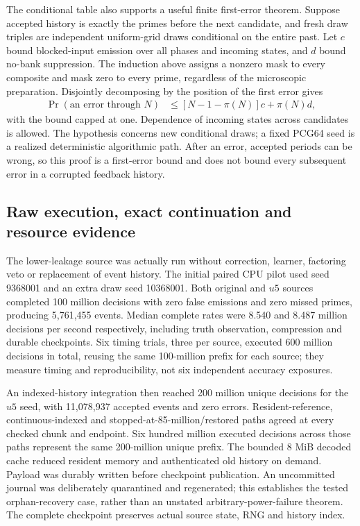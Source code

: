 The conditional table also supports a useful finite first-error theorem. Suppose accepted history is exactly the primes before the next candidate, and fresh draw triples are independent uniform-grid draws conditional on the entire past. Let $c$ bound blocked-input emission over all phases and incoming states, and $d$ bound no-bank suppression. The induction above assigns a nonzero mask to every composite and mask zero to every prime, regardless of the microscopic preparation. Disjointly decomposing by the position of the first error gives
\begin{align*}
 \Pr(\text{an error through }N)
 &\le [N-1-\pi(N)]c+\pi(N)d,
\end{align*}
with the bound capped at one. Dependence of incoming states across candidates is allowed. The hypothesis concerns new conditional draws; a fixed PCG64 seed is a realized deterministic algorithmic path. After an error, accepted periods can be wrong, so this proof is a first-error bound and does not bound every subsequent error in a corrupted feedback history.

\subsection{Raw execution, exact continuation and resource evidence}

The lower-leakage source was actually run without correction, learner, factoring veto or replacement of event history. The initial paired CPU pilot used seed 9368001 and an extra draw seed 10368001. Both original and $u5$ sources completed 100 million decisions with zero false emissions and zero missed primes, producing 5,761,455 events. Median complete rates were 8.540 and 8.487 million decisions per second respectively, including truth observation, compression and durable checkpoints. Six timing trials, three per source, executed 600 million decisions in total, reusing the same 100-million prefix for each source; they measure timing and reproducibility, not six independent accuracy exposures.

An indexed-history integration then reached 200 million unique decisions for the $u5$ seed, with 11,078,937 accepted events and zero errors. Resident-reference, continuous-indexed and stopped-at-85-million/restored paths agreed at every checked chunk and endpoint. Six hundred million executed decisions across those paths represent the same 200-million unique prefix. The bounded 8 MiB decoded cache reduced resident memory and authenticated old history on demand. Payload was durably written before checkpoint publication. An uncommitted journal was deliberately quarantined and regenerated; this establishes the tested orphan-recovery case, rather than an unstated arbitrary-power-failure theorem. The complete checkpoint preserves actual source state, RNG and history index.

